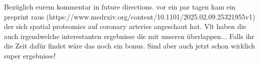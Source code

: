 \documentclass[a4paper,12pt]{article}
\begin{document}
Bezüglich eurem kommentar in future directions. vor ein par tagen kam ein preprint raus (https://www.medrxiv.org/content/10.1101/2025.02.09.25321955v1) der sich spatial proteomics auf coronary arteries angeschaut hat. Vlt haben die auch irgendwelche interestanten ergebnisse die mit unseren überlappen... Falls ihr die Zeit dafür findet wäre das noch ein bonus. Sind aber auch jetzt schon wirklich super ergebnisse!

\end{document}
